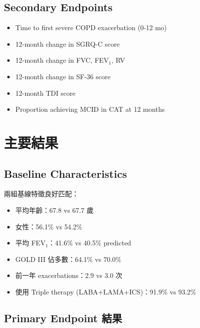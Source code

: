 \documentclass[12pt,a4paper]{article}
\begin{document}
\subsection{Secondary Endpoints}

\begin{itemize}
    \item Time to first severe COPD exacerbation (0-12 mo)
    \item 12-month change in SGRQ-C score
    \item 12-month change in FVC, FEV$_1$, RV
    \item 12-month change in SF-36 score
    \item 12-month TDI score
    \item Proportion achieving MCID in CAT at 12 months
\end{itemize}

\section{主要結果}

\subsection{Baseline Characteristics}

兩組基線特徵良好匹配：
\begin{itemize}
    \item 平均年齡：67.8 vs 67.7 歲
    \item 女性：56.1\% vs 54.2\%
    \item 平均 FEV$_1$：41.6\% vs 40.5\% predicted
    \item GOLD III 佔多數：64.1\% vs 70.0\%
    \item 前一年 exacerbations：2.9 vs 3.0 次
    \item 使用 Triple therapy (LABA+LAMA+ICS)：91.9\% vs 93.2\%
\end{itemize}

\subsection{Primary Endpoint 結果}

\end{document}

